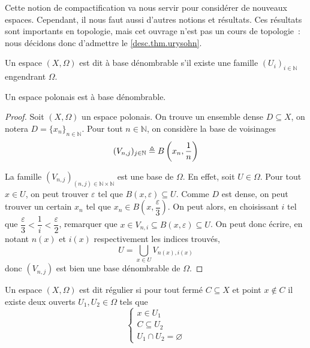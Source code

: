 Cette notion de compactification va nous servir pour considérer de nouveaux
espaces. Cependant, il nous faut aussi d'autres notions et résultats. Ces
résultats sont importants en topologie, mais cet ouvrage n'est pas un cours de
topologie~: nous décidons donc d'admettre le \cref{desc.thm.urysohn}.

\begin{definition}
  Un espace $(X,\Omega)$ est dit à base dénombrable s'il existe une famille
  $(U_i)_{i\in\mathbb N}$ engendrant $\Omega$.
\end{definition}

\begin{proposition}
  Un espace polonais est à base dénombrable.
\end{proposition}

\begin{proof}
  Soit $(X,\Omega)$ un espace polonais. On trouve un ensemble dense
  $D\subseteq X$, on notera $D = \{x_n\}_{n\in\mathbb N}$. Pour tout
  $n\in\mathbb N$, on considère la base de voisinages
  \[(V_{n,j})_{j\in \mathbb N} \triangleq B\left(x_n,\frac{1}{n}\right)\]

  La famille $(V_{n,j})_{(n,j)\in\mathbb N\times\mathbb N}$ est une base de $\Omega$.
  En effet, soit $U\in\Omega$. Pour tout $x\in U$, on peut trouver
  $\varepsilon$ tel que $B(x,\varepsilon)\subseteq U$. Comme $D$ est dense,
  on peut trouver un certain $x_n$ tel que
  $x_n \in B\left(x,\dfrac{\varepsilon}{3}\right)$. On peut alors, en
  choisissant $i$ tel que
  $\dfrac{\varepsilon}{3} < \dfrac{1}{i} < \dfrac{\varepsilon}{2}$, remarquer
  que $x\in V_{n,i}\subseteq B(x,\varepsilon)\subseteq U$. On peut donc écrire,
  en notant $n(x)$ et $i(x)$ respectivement les indices trouvés,
  \[U = \bigcup_{x\in U} V_{n(x),i(x)}\]
  donc $(V_{n,j})$ est bien une base dénombrable de $\Omega$.
\end{proof}

\begin{definition}
  Un espace $(X,\Omega)$ est dit régulier si pour tout fermé $C\subseteq X$ et
  point $x\notin C$ il existe deux ouverts $U_1,U_2\in\Omega$ tels que
  \[\left\{
  \begin{array}{l}
    x\in U_1\\
    C\subseteq U_2\\
    U_1\cap U_2 = \varnothing
  \end{array}
  \right.\]
\end{definition}

